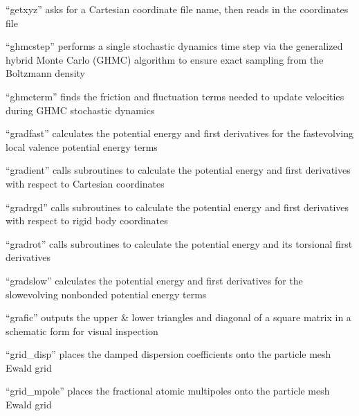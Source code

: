 \documentclass[letterpaper,11pt,english]{sphinxmanual}
\begin{document}

“getxyz” asks for a Cartesian coordinate file name,
then reads in the coordinates file


“ghmcstep” performs a single stochastic dynamics time step via
the generalized hybrid Monte Carlo (GHMC) algorithm to ensure
exact sampling from the Boltzmann density


“ghmcterm” finds the friction and fluctuation terms needed
to update velocities during GHMC stochastic dynamics


“gradfast” calculates the potential energy and first derivatives
for the fast\sphinxhyphen{}evolving local valence potential energy terms


“gradient” calls subroutines to calculate the potential energy
and first derivatives with respect to Cartesian coordinates


“gradrgd” calls subroutines to calculate the potential energy
and first derivatives with respect to rigid body coordinates


“gradrot” calls subroutines to calculate the potential
energy and its torsional first derivatives


“gradslow” calculates the potential energy and first derivatives
for the slow\sphinxhyphen{}evolving nonbonded potential energy terms


“grafic” outputs the upper \& lower triangles and diagonal
of a square matrix in a schematic form for visual inspection


“grid\_disp” places the damped dispersion coefficients onto
the particle mesh Ewald grid


“grid\_mpole” places the fractional atomic multipoles onto
the particle mesh Ewald grid
\end{document}
